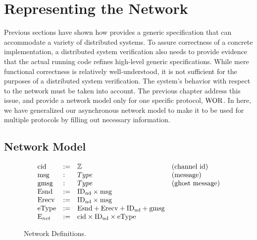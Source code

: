 \section{Representing the Network}
\label{chapter:witnesspassing:sec:low-level-implementation}


Previous sections have shown how \sysname{} provides a generic specification
that can accommodate a variety of distributed systems.  To assure correctness of
a concrete implementation, a distributed system verification also needs to
provide evidence that the actual running code refines high-level generic
specifications. While mere functional correctness is relatively well-understood,
it is not sufficient for the purposes of a distributed system verification. The
system's behavior with respect to the network must be taken into account. 
The previous chapter address this issue, and 
provide a network model only for one specific protocol, $\mathrm{WOR}$. 
In here, we have generalized our  asynchronous network model to make it to be used 
for multiple protocols by filling out necessary information. 


\subsection{Network Model}
\label{chapter:witnesspassing:subsec:network-model}

\begin{figure}
\begin{small}
\raggedright
$$
\begin{array}{llll}
\mathrm{cid} & := & \mathbb{Z} & \mbox{(channel id)} \\
\mathrm{msg} & : & Type & \mbox{(message)} \\
\mathrm{gmsg} & : & Type & \mbox{(ghost message)} \\
\mathrm{Esnd} & := & \mathrm{ID_{nd}} \times \mathrm{msg} \\
\mathrm{Erecv} & := & \mathrm{ID_{nd}} \times \mathrm{msg} \\
\mathrm{eType} & := & \mathrm{Esnd} + \mathrm{Erecv} + \mathrm{ID_{nd}} + \mathrm{gmsg} \\
\mathrm{E}_{net} & := & \mathrm{cid} \times \mathrm{ID_{nd}} \times \mathrm{eType} \\
\end{array}
$$
\end{small}
\caption{Network Definitions.}
\label{fig:chapter:witnesspassing:net-defs}
\end{figure}


